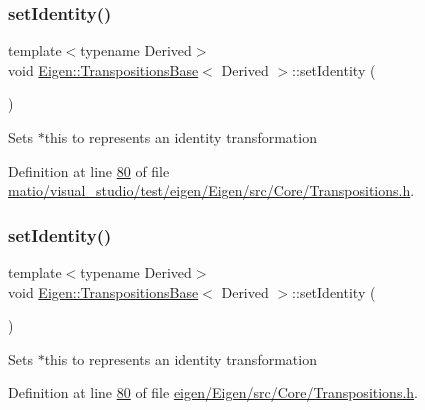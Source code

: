 \subsubsection{\texorpdfstring{set\+Identity()}{setIdentity()}\hspace{0.1cm}{\footnotesize\ttfamily [1/2]}}
{\footnotesize\ttfamily template$<$typename Derived$>$ \\
void \hyperlink{class_eigen_1_1_transpositions_base}{Eigen\+::\+Transpositions\+Base}$<$ Derived $>$\+::set\+Identity (\begin{DoxyParamCaption}{ }\end{DoxyParamCaption})\hspace{0.3cm}{\ttfamily [inline]}}

Sets {\ttfamily $\ast$this} to represents an identity transformation 

Definition at line \hyperlink{matio_2visual__studio_2test_2eigen_2_eigen_2src_2_core_2_transpositions_8h_source_l00080}{80} of file \hyperlink{matio_2visual__studio_2test_2eigen_2_eigen_2src_2_core_2_transpositions_8h_source}{matio/visual\+\_\+studio/test/eigen/\+Eigen/src/\+Core/\+Transpositions.\+h}.

\mbox{\label{class_eigen_1_1_transpositions_base_a8da379438691ea694948ea5ae31d305f}} 
\subsubsection{\texorpdfstring{set\+Identity()}{setIdentity()}\hspace{0.1cm}{\footnotesize\ttfamily [2/2]}}
{\footnotesize\ttfamily template$<$typename Derived$>$ \\
void \hyperlink{class_eigen_1_1_transpositions_base}{Eigen\+::\+Transpositions\+Base}$<$ Derived $>$\+::set\+Identity (\begin{DoxyParamCaption}{ }\end{DoxyParamCaption})\hspace{0.3cm}{\ttfamily [inline]}}

Sets {\ttfamily $\ast$this} to represents an identity transformation 

Definition at line \hyperlink{eigen_2_eigen_2src_2_core_2_transpositions_8h_source_l00080}{80} of file \hyperlink{eigen_2_eigen_2src_2_core_2_transpositions_8h_source}{eigen/\+Eigen/src/\+Core/\+Transpositions.\+h}.

